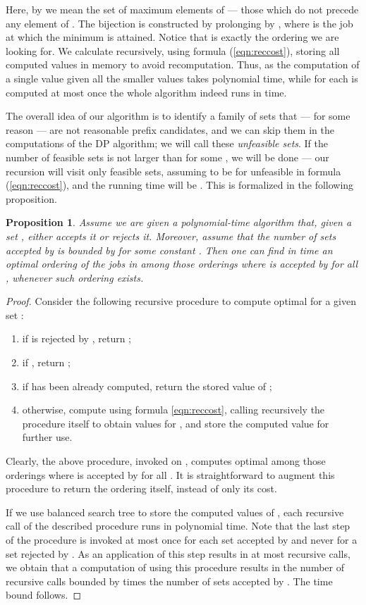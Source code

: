 \documentclass{article}
\newtheorem{proposition}[theorem]{Proposition}
\theoremstyle{definition}
\begin{document}
Here, by  we mean the set of maximum elements of  --- those which do not precede any element of .
The bijection  is constructed by prolonging  by ,
where  is the job at which the minimum is attained.
Notice that  is exactly the ordering we are looking for.
We calculate  recursively, using formula (\ref{eqn:reccost}),
storing all computed values  in memory to avoid recomputation.
Thus, as the computation of a single  value given all the smaller values
takes polynomial time, while  for each  is computed at most once
the whole algorithm indeed runs in  time.

The overall idea of our algorithm is to identify a family of sets  that --- for some
reason --- are not reasonable prefix candidates, and we can skip them in the computations of the
DP algorithm; we will call these {\em unfeasible sets}. If the number of feasible sets is not
larger than  for some , we will be done --- our recursion will visit only
feasible sets, assuming  to be  for unfeasible  in formula
(\ref{eqn:reccost}), and the running time will be . This is formalized
in the following proposition.

\begin{proposition}\label{prop:cut-dp}
Assume we are given a polynomial-time algorithm  that, given a set ,
either accepts it or rejects it. Moreover, assume that the number of sets accepted by 
is bounded by  for some constant . Then one can find in time  an optimal
ordering of the jobs in  among those orderings  where  is
accepted by  for all , whenever such ordering exists.
\end{proposition}
\begin{proof}
Consider the following recursive procedure to compute optimal  for a given set :
\begin{enumerate}
\item if  is rejected by , return ;
\item if , return ;
\item if  has been already computed, return the stored value of ;
\item otherwise, compute  using formula \eqref{eqn:reccost}, calling recursively the procedure
itself to obtain values  for , and store the computed value
for further use.
\end{enumerate}
Clearly, the above procedure, invoked on , computes optimal  among those orderings
 where  is accepted by  for all .
It is straightforward to augment this procedure to return the ordering  itself, instead of only its cost.

If we use balanced search tree to store the computed values of ,
each recursive call of the described procedure runs in polynomial time.
Note that the last step of the procedure is invoked at most once for each set  accepted by 
and never for a set  rejected by .
As an application of this step results in at most  recursive calls,
we obtain that a computation of  using this procedure results in the number
of recursive calls bounded by  times the number of sets accepted by . The time bound follows.
\end{proof}
\end{document}
